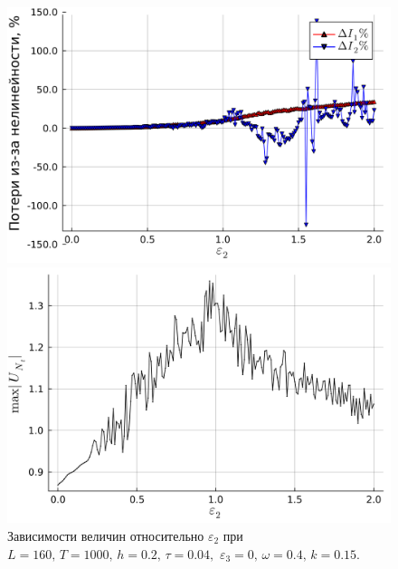 \documentclass[14pt,a4paper]{extreport}
\begin{document}
			\begin{figure}[H] %
				\begin{center}
					\begin{minipage}[h]{0.48\linewidth}
						\includegraphics[width=1\linewidth]{fig78.png}
					\end{minipage}
					\hfill
					\begin{minipage}[h]{0.48\linewidth}
						\includegraphics[width=1\linewidth]{fig79.png}
					\end{minipage}
				\end{center}
				\caption{Зависимости величин относительно \(\varepsilon_{2}\) при
				\(L=160,\, T=1000,\, h=0.2,\, \tau=0.04,\)
				\(\varepsilon_{3}=0,\, \omega=0.4,\, k=0.15\).}
				\label{fig340-5-4}
			\end{figure}
\end{document}
